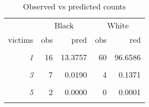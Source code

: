 \begin{table}[ht]

\caption{\label{tab:obs_vs_pred}Observed vs predicted counts}
\centering
\begin{tabular}[t]{>{}rrrrr}
\toprule
\multicolumn{1}{c}{ } & \multicolumn{2}{c}{Black} & \multicolumn{2}{c}{White} \\
\cmidrule(l{3pt}r{3pt}){2-3} \cmidrule(l{3pt}r{3pt}){4-5}
victims & obs & pred & obs & red\\
\midrule
\em{\cellcolor{gray!6}{0}} & \cellcolor{gray!6}{119} & \cellcolor{gray!6}{144.9879} & \cellcolor{gray!6}{1070} & \cellcolor{gray!6}{1047.7425}\\
\em{1} & 16 & 13.3757 & 60 & 96.6586\\
\em{\cellcolor{gray!6}{2}} & \cellcolor{gray!6}{12} & \cellcolor{gray!6}{0.6170} & \cellcolor{gray!6}{14} & \cellcolor{gray!6}{4.4586}\\
\em{3} & 7 & 0.0190 & 4 & 0.1371\\
\em{\cellcolor{gray!6}{4}} & \cellcolor{gray!6}{3} & \cellcolor{gray!6}{0.0004} & \cellcolor{gray!6}{0} & \cellcolor{gray!6}{0.0032}\\
\addlinespace
\em{5} & 2 & 0.0000 & 0 & 0.0001\\
\em{\cellcolor{gray!6}{6}} & \cellcolor{gray!6}{0} & \cellcolor{gray!6}{0.0000} & \cellcolor{gray!6}{1} & \cellcolor{gray!6}{0.0000}\\
\bottomrule
\end{tabular}
\end{table}
